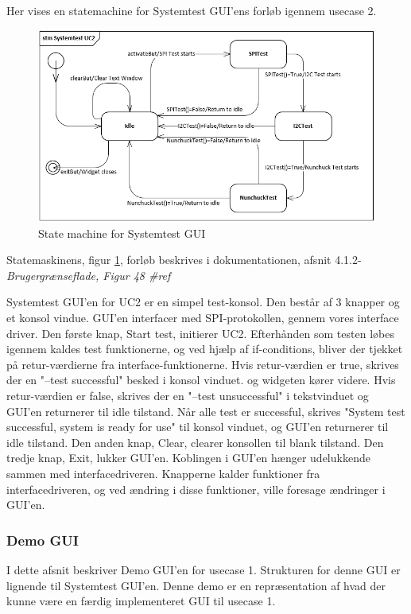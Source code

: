\noindent Her vises en statemachine for Systemtest GUI'ens forløb igennem usecase 2.

\begin{figure}[H]
	\centering
	\includegraphics[width=1.2\textwidth]{Afsnit/DesignOgImplementering/images/StateMachineUC2}
	\caption{State machine for Systemtest GUI}
	\label{fig:StateMachineUC2}
\end{figure}

\noindent Statemaskinens, figur \ref{fig:StateMachineUC2}, forløb beskrives i dokumentationen, afsnit 4.1.2-\textit{Brugergrænseflade, Figur 48 \#ref} 

\noindent Systemtest GUI'en for UC2 er en simpel test-konsol. Den består af 3 knapper og et konsol vindue. GUI'en interfacer med SPI-protokollen, gennem vores interface driver. Den første knap, Start test, initierer UC2. Efterhånden som testen løbes igennem kaldes test funktionerne, og ved hjælp af if-conditions, bliver der tjekket på retur-værdierne fra interface-funktionerne. Hvis retur-værdien er true, skrives der en "--test successful" besked i konsol vinduet. og widgeten kører videre. Hvis retur-værdien er false, skrives der en "--test unsuccessful" i tekstvinduet og GUI'en returnerer til idle tilstand. Når alle test er successful, skrives "System test successful, system is ready for use" til konsol vinduet, og GUI'en returnerer til idle tilstand. Den anden knap, Clear, clearer konsollen til blank tilstand. Den tredje knap, Exit, lukker GUI'en. \newline
\noindent Koblingen i GUI'en hænger udelukkende sammen med interfacedriveren. Knapperne kalder funktioner fra interfacedriveren, og ved ændring i disse funktioner, ville foresage ændringer i GUI'en. 

\subsubsection{Demo GUI}
I dette afsnit beskriver Demo GUI'en for usecase 1. Strukturen for denne GUI er lignende til Systemtest GUI'en. Denne demo er en repræsentation af hvad der kunne være en færdig implementeret GUI til usecase 1.

